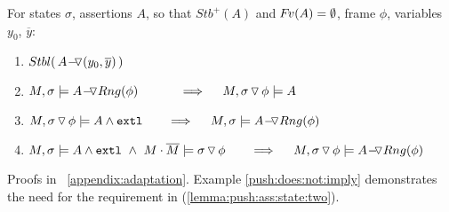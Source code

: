 {
\begin{lemma} 
\label{lemma:push:ass:state}
For  states  $\sigma$, assertions $A$, %
so that $Stb^+(A)$ and $\fv(A)=\emptyset$,  %
frame $\phi$,  variables $y_0$, $\overline y$: %

\begin{enumerate}
 \item
\label{l:push:stbl}
$\Stable{\,  \PushASLong {(y_0,\overline y)} A\, }$
\item
 \label{lemma:push:ass:state:one}
$M, \sigma \models \PushASLong  {Rng(\phi)} {A}\ \  \ \ \ \ \  \ \ \    \Longrightarrow  \ \ \ \ M,  \PushSLong {\phi} {\sigma}   \models A$
\item
 \label{lemma:push:ass:state:two}
$M,  \PushSLong {\phi} {\sigma}   \models  A  \wedge \extThis    \ \  \ \ \  \  \Longrightarrow  \ \ \ \ M, \sigma \models \PushASLong  {Rng(\phi)} {A}$
 \item
 \label{lemma:push:ass:state:three}
$M, \sigma  \models  A  \wedge \extThis  \ \wedge \ M\cdot\Mtwo \models \PushSLong {\phi} {\sigma}   \ \  \ \ \  \  \Longrightarrow  \ \ \ \ M, \PushSLong {\phi} {\sigma} \models \PushASLong  {Rng(\phi)} {A}$
\end{enumerate}
\end{lemma}
}

{
Proofs %
 in \A\ \ref{appendix:adaptation}. Example \ref{push:does:not:imply}
 demonstrates the need for the     %
  requirement in  %
  (\ref{lemma:push:ass:state:two}). %
}



